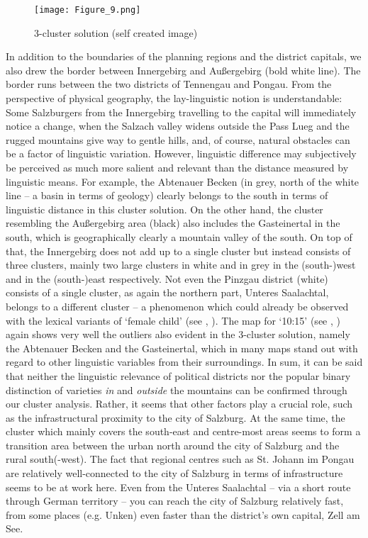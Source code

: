 \documentclass[output=paper,colorlinks, citecolor=brown]{langscibook}
\begin{document}
  
\begin{figure}
\texttt{[image: Figure\_9.png]}
\caption{3-cluster solution (self created image)}
\label{fig:blaßnigg:9}
\end{figure}

In addition to the boundaries of the planning regions and the district capitals, we also drew the border between Innergebirg and Außergebirg (bold white line). The border runs between the two districts of Tennengau and Pongau. From the perspective of physical geography, the lay-linguistic notion is understandable: Some Salzburgers from the Innergebirg travelling to the capital will immediately notice a change, when the Salzach valley widens outside the Pass Lueg and the rugged mountains give way to gentle hills, and, of course, natural obstacles can be a factor of linguistic variation. However, linguistic difference may subjectively be perceived as much more salient and relevant than the distance measured by linguistic means. For example, the Abtenauer Becken (in grey, north of the white line – a basin in terms of geology) clearly belongs to the south in terms of linguistic distance in this cluster solution. On the other hand, the cluster resembling the Außergebirg area (black) also includes the Gasteinertal in the south, which is geographically clearly a mountain valley of the south. On top of that, the Innergebirg does not add up to a single cluster but instead consists of three clusters, mainly two large clusters in white and in grey in the (south-)west and in the (south\nobreakdash-)east respectively. Not even the Pinzgau district (white) consists of a single cluster, as again the northern part, Unteres Saalachtal, belongs to a different cluster – a phenomenon which could already be observed with the lexical variants of `female child' (see , ). The map for `10:15' (see , ) again shows very well the outliers also evident in the 3-cluster solution, namely the Abtenauer Becken and the Gasteinertal, which in many maps stand out with regard to other linguistic variables from their surroundings. In sum, it can be said that neither the linguistic relevance of political districts nor the popular binary distinction of varieties \textit{in} and \textit{outside} the mountains can be confirmed through our cluster analysis. Rather, it seems that other factors play a crucial role, such as the infrastructural proximity to the city of Salzburg. At the same time, the cluster which mainly covers the south-east and centre-most areas seems to form a transition area between the urban north around the city of Salzburg and the rural south(-west). The fact that regional centres such as St. Johann im Pongau are relatively well-connected to the city of Salzburg in terms of infrastructure seems to be at work here. Even from the Unteres Saalachtal – via a short route through German territory – you can reach the city of Salzburg relatively fast, from some places (e.g. Unken) even faster than the district’s own capital, Zell am See.
\end{document}
